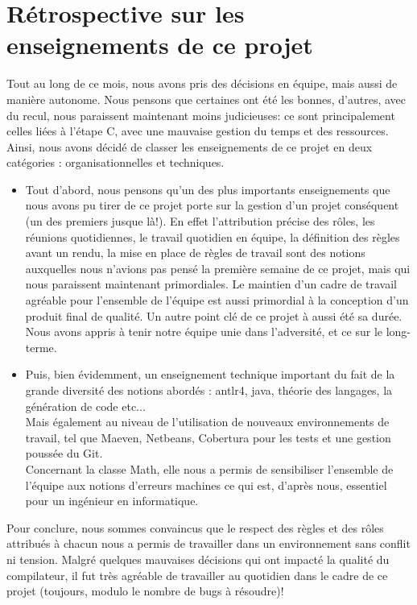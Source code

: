 \documentclass{article}
\begin{document}
\section{Rétrospective sur les enseignements de ce projet}
Tout au long de ce mois, nous avons pris des décisions en équipe, mais aussi de manière autonome.
Nous pensons que certaines ont été les bonnes, d'autres, avec du recul, nous paraissent maintenant moins judicieuses: ce sont principalement celles liées à l'étape C, avec une mauvaise gestion du temps et des ressources.
\newline
Ainsi, nous avons décidé de classer les enseignements de ce projet en deux catégories : organisationnelles et techniques.
\begin{itemize}
\item Tout d'abord, nous pensons qu'un des plus importants enseignements que nous avons pu tirer de ce projet
porte sur la gestion d'un projet conséquent (un des premiers jusque là!). En effet l'attribution précise des rôles, les réunions
 quotidiennes, le travail quotidien en équipe,
la définition des règles avant un rendu, la mise en place de règles de travail sont des notions auxquelles nous
 n'avions pas pensé la première semaine de ce projet, mais qui nous paraissent maintenant primordiales.
Le maintien d'un cadre de travail agréable pour l'ensemble de l'équipe est aussi primordial à la conception d'un produit final de qualité. Un autre point clé de ce projet à aussi été sa durée. Nous avons appris à tenir notre équipe unie dans l'adversité, et ce sur le long-terme.
\item Puis, bien évidemment, un enseignement technique important du fait de la grande diversité des notions abordés :
antlr4, java, théorie des langages, la génération de code etc...\\
Mais également au niveau de l'utilisation de nouveaux environnements de travail, tel que Maeven, Netbeans, Cobertura pour les tests et une gestion poussée du Git. \\
Concernant la classe Math, elle nous a permis de sensibiliser l'ensemble de l'équipe aux notions d'erreurs machines ce qui est,
d'après nous, essentiel pour un ingénieur en informatique.\\
\end{itemize}

Pour conclure, nous sommes convaincus que le respect des règles et des rôles attribués à chacun nous a permis de travailler
dans un environnement sans conflit ni tension. Malgré quelques mauvaises décisions qui ont impacté la qualité du compilateur, il fut très agréable de travailler au quotidien dans le cadre de ce projet (toujours, modulo le nombre de bugs à résoudre)!
\end{document}
